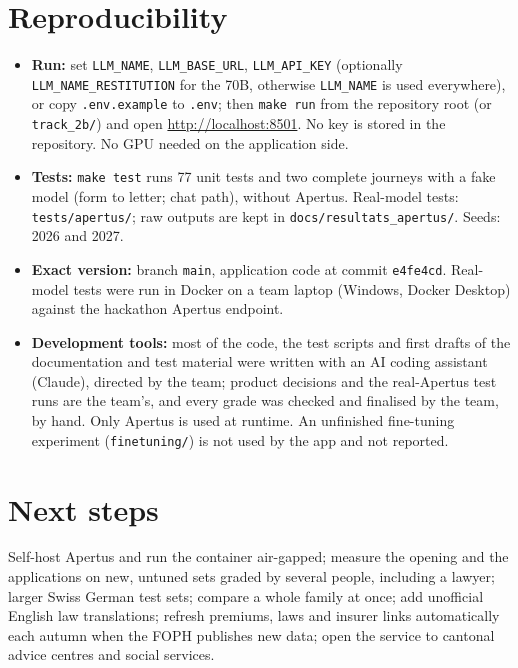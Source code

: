\documentclass[10pt,a4paper]{article}
\newcommand{\gras}[1]{\textbf{#1}}
\begin{document}
\section{Reproducibility}
\begin{itemize}
\item \gras{Run:} set \texttt{LLM\_NAME}, \texttt{LLM\_BASE\_URL}, \texttt{LLM\_API\_KEY} (optionally
  \texttt{LLM\_NAME\_RESTITUTION} for the 70B, otherwise \texttt{LLM\_NAME} is used everywhere), or copy
  \texttt{.env.example} to \texttt{.env}; then \texttt{make run} from the repository root (or \texttt{track\_2b/}) and
  open \url{http://localhost:8501}. No key is stored in the repository. No GPU needed on the application side.
\item \gras{Tests:} \texttt{make test} runs 77 unit tests and two complete journeys with a fake model (form to
  letter; chat path), without Apertus. Real-model tests: \texttt{tests/apertus/}; raw outputs are kept in
  \texttt{docs/resultats\_apertus/}. Seeds: 2026 and 2027.
\item \gras{Exact version:} branch \texttt{main}, application code at commit \texttt{e4fe4cd}. Real-model tests were run in
  Docker on a team laptop (Windows, Docker Desktop) against the hackathon Apertus endpoint.
\item \gras{Development tools:} most of the code, the test scripts and first drafts of the documentation and test
  material were written with an AI coding assistant (Claude), directed by the team; product decisions and the
  real-Apertus test runs are the team's, and every grade was checked and finalised by the team, by hand. Only Apertus
  is used at runtime. An unfinished fine-tuning experiment (\texttt{finetuning/}) is not used by the app and not
  reported.
\end{itemize}

\section{Next steps}
Self-host Apertus and run the container air-gapped; measure the opening and the applications on new, untuned sets
graded by several people, including a lawyer; larger Swiss German test sets; compare a whole family at once; add
unofficial English law translations; refresh premiums, laws and insurer links automatically each autumn when the
FOPH publishes new data; open the service to cantonal advice centres and social services.
\end{document}
